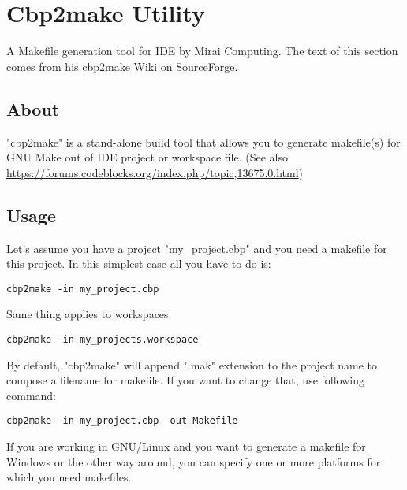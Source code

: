 \section{Cbp2make Utility}\label{sec:cbp2make}

A Makefile generation tool for \codeblocks IDE by Mirai Computing. The text of this section comes from his cbp2make Wiki on SourceForge.

\subsection{About}

"cbp2make" is a stand-alone build tool that allows you to generate makefile(s) for GNU Make out of \codeblocks IDE project or workspace file. (See also \url{https://forums.codeblocks.org/index.php/topic,13675.0.html})

\subsection{Usage}

Let's assume you have a project "my\_project.cbp" and you need a makefile for this project. In this simplest case all you have to do is:
\begin{lstlisting}
cbp2make -in my_project.cbp
\end{lstlisting}

Same thing applies to workspaces.
\begin{lstlisting}
cbp2make -in my_projects.workspace
\end{lstlisting}

By default, "cbp2make" will append ".mak" extension to the project name to compose a filename for makefile.
If you want to change that, use following command:

\begin{lstlisting}
cbp2make -in my_project.cbp -out Makefile
\end{lstlisting}

If you are working in GNU/Linux and you want to generate a makefile for Windows or the other way around, you can specify one or more platforms for which you need makefiles.

